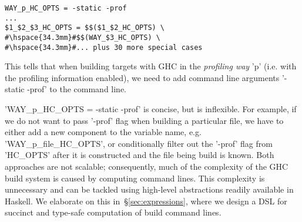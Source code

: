 \begin{lstlisting}
WAY_p_HC_OPTS = -static -prof
...
$1_$2_$3_HC_OPTS = $$($1_$2_HC_OPTS) \
#\hspace{34.3mm}#$$(WAY_$3_HC_OPTS) \
#\hspace{34.3mm}#... plus 30 more special cases
\end{lstlisting}

This tells that when building targets with GHC in the \emph{profiling way}
\lst'p' (i.e. with the profiling information enabled), we need to add command
line arguments \lst'-static -prof' to the command line. 

\lst'WAY_p_HC_OPTS = -static -prof' is concise, but is inflexible. For example,
if we do not want to pass \lst'-prof' flag when building a particular file, we
have to either add a new component to the variable name, e.g.
\lst'WAY_p_file_HC_OPTS', or conditionally filter out the \lst'-prof' flag from
\lst'HC_OPTS' after it is constructed and the file being build is known. Both
approaches are not scalable; consequently, much of the complexity of the GHC
build system is caused by computing command lines. This complexity is
unnecessary and can be tackled using high-level abstractions readily available
in Haskell. We elaborate on this in~\S\ref{sec:expressions}, where we design a
DSL for succinct and type-safe computation of build command lines.

% 
% 


